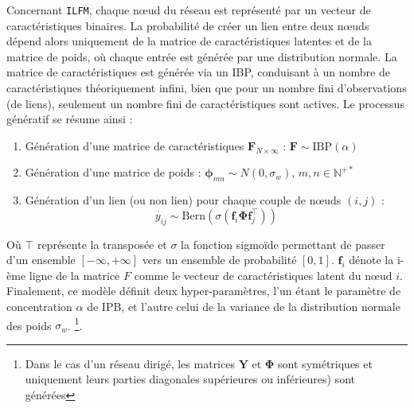 \documentclass[french]{hermes-journal}
\newcommand{\ilfm}{\texttt{ILFM}}
\newcommand{\IBP}{\mathrm{IBP}}
\newcommand{\mat}[1]{\bm{#1}}
\begin{document}
Concernant \ilfm, chaque n\oe{}ud du réseau est représenté par un vecteur de caractéristiques binaires. La probabilité de créer un lien entre deux n\oe{}uds dépend alors uniquement de la matrice de caractéristiques latentes et de la matrice  de poids, où chaque entrée est générée par une distribution normale. La matrice de caractéristiques est générée via un IBP, conduisant à un nombre de caractéristiques théoriquement infini, bien que pour un nombre fini d'observations (de liens), seulement un nombre fini de caractéristiques sont actives. Le processus génératif se résume ainsi :
\begin{enumerate}
\item Génération d'une matrice de caractéristiques $\mat{F}_{N \times \infty}$ : $\mat{F} \sim \IBP(\alpha)$
\item Génération d'une matrice de poids : $\mat{\phi}_{mn} \sim N(0, \sigma_w), \, m,n \in \mathbb{N}^{+*}$
\item Génération d'un lien (ou non lien) pour chaque couple de n\oe{}uds $(i,j)$ : 
\begin{equation*}
y_{ij} \sim \mathrm{Bern}(\sigma(\mat{f}_{i} \mat{\Phi} \mat{f}_{j}^\top))
\label{eq:link-ilfm}
\end{equation*}
\end{enumerate}
%

Où $\top$ représente la transposée et $\sigma$ la fonction sigmoïde permettant de passer d'un ensemble $[-\infty, +\infty]$ vers un ensemble de probabilité $[0,1]$.  $\mat{f}_{i}$ dénote la i-ème ligne de la matrice $F$ comme le vecteur de caractéristiques latent du n\oe{}ud $i$. Finalement, ce modèle définit deux hyper-paramètres, l'un étant le paramètre de concentration $\alpha$ de IPB, et l'autre celui de la variance de la distribution normale des poids $\sigma_w$. \footnote{Dans le cas d'un réseau dirigé, les matrices $\mat{Y}$ et $\mat{\Phi}$ sont symétriques et uniquement leurs parties diagonales supérieures ou inférieures) sont générées}. ~\\
\end{document}
